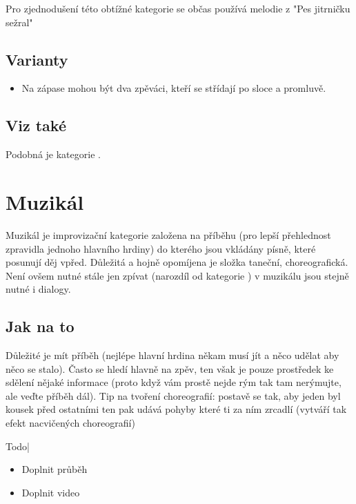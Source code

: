 Pro zjednodušení této obtížné kategorie se občas používá melodie z "Pes jitrničku sežral" 
 
\subsection{Varianty} \begin{itemize}
\item  Na zápase mohou být dva zpěváci, kteří se střídají po sloce a promluvě.
\end{itemize}
 
\subsection{Viz také} Podobná je kategorie . 
 
 
 
 
 
\needspace{5cm} \section{Muzikál} \label{muzikál}  
 
Muzikál je improvizační kategorie založena na příběhu (pro lepší přehlednost zpravidla jednoho hlavního hrdiny) do kterého jsou vkládány písně, které posunují děj vpřed. Důležitá a hojně opomíjena je složka taneční, choreografická. Není ovšem nutné stále jen zpívat (narozdíl od kategorie ) v muzikálu jsou stejně nutné i dialogy. 
 
\subsection{Jak na to}  
Důležité je mít příběh (nejlépe hlavní hrdina někam musí jít a něco udělat aby něco se stalo). Často se hledí hlavně na zpěv, ten však je pouze prostředek ke sdělení nějaké informace (proto když vám prostě nejde rým tak tam nerýmujte, ale veďte příběh dál). Tip na tvoření choreografií: postavě se tak, aby jeden byl kousek před ostatními ten pak udává pohyby které ti za ním zrcadlí (vytváří tak efekt nacvičených choreografií) 
 
{{Todo| 
\begin{itemize}
\item  Doplnit průběh
\item  Doplnit video
\end{itemize}
}} 
 
 
 
